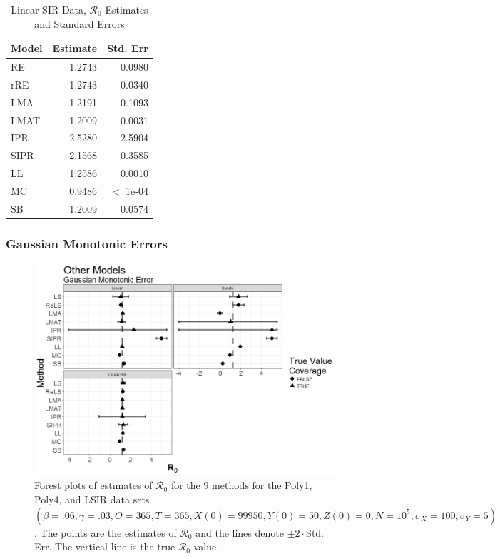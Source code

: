 \documentclass[12pt]{article}
\newcommand{\xxsir}{\ensuremath{9} } %
\newcommand{\rr}{\ensuremath{\mathcal{R}_0}}
\begin{document}
\begin{table}[H]
	
	\centering
	\begin{tabular}[t]{l|r|r}
		\hline
		Model & Estimate & Std. Err\\
		\hline
		RE & 1.2743 & 0.0980\\
		\hline
		rRE & 1.2743 & 0.0340\\
		\hline
		LMA & 1.2191 & 0.1093\\
		\hline
		LMAT & 1.2009 & 0.0031\\
		\hline
		IPR & 2.5280 & 2.5904\\
		\hline
		SIPR & 2.1568 & 0.3585\\
		\hline
		LL & 1.2586 & 0.0010\\
		\hline
		MC & 0.9486 & $<$ 1e-04 \\
		\hline
		SB & 1.2009 & 0.0574\\
		\hline
	\end{tabular}
	\caption{Linear SIR Data, $\rr$ Estimates and Standard Errors}\label{tab:other-res3}
\end{table}

\subsubsection{Gaussian Monotonic Errors}

\begin{figure}[H]
	\begin{center}
		\includegraphics[scale=0.5]{images/other_nm.jpeg}
		\caption{Forest plots of estimates of $\rr$ for the \xxsir methods for the Poly1, Poly4, and LSIR data sets $(\beta=.06, \gamma=.03, O=365, T=365, X(0)=99950, Y(0)=50, Z(0)=0, N=10^5, \sigma_X=100, \sigma_Y=5)$.  The points are the estimates of $\rr$ and the lines denote $\pm 2\cdot $Std. Err.  The vertical line is the true $\rr$ value.}
	\end{center}
\end{figure}
\end{document}
